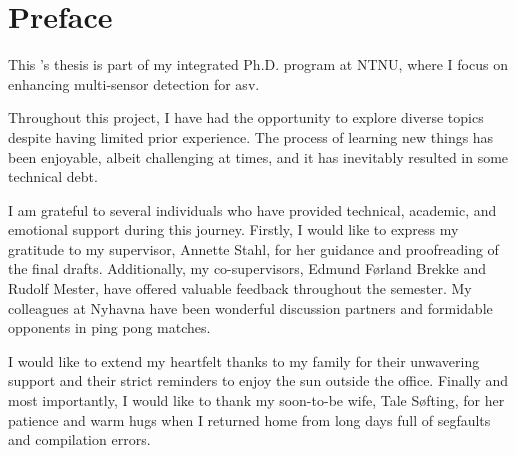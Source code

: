 \chapter*{Preface}

This \master's thesis is part of my integrated Ph.D. program at NTNU, where I focus on enhancing multi-sensor detection for \gls{asv}.

Throughout this project, I have had the opportunity to explore diverse topics despite having limited prior experience. The process of learning new things has been enjoyable, albeit challenging at times, and it has inevitably resulted in some technical debt.

I am grateful to several individuals who have provided technical, academic, and emotional support during this journey. Firstly, I would like to express my gratitude to my supervisor, Annette Stahl, for her guidance and proofreading of the final drafts. Additionally, my co-supervisors, Edmund Førland Brekke and Rudolf Mester, have offered valuable feedback throughout the semester. My colleagues at Nyhavna have been wonderful discussion partners and formidable opponents in ping pong matches.

I would like to extend my heartfelt thanks to my family for their unwavering support and their strict reminders to enjoy the sun outside the office.
Finally and most importantly, I would like to thank my soon-to-be wife, Tale Søfting, for her patience and warm hugs when I returned home from long days full of segfaults and compilation errors.




